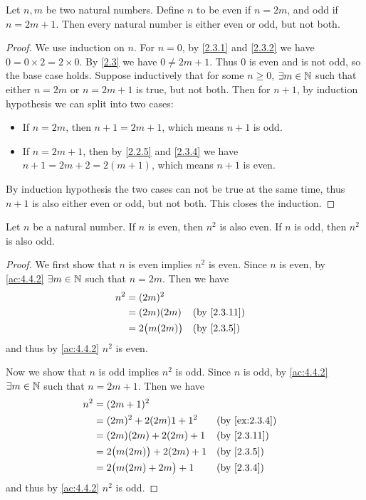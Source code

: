 \begin{ac}\label{ac:4.4.2}
  Let \(n, m\) be two natural numbers.
  Define \(n\) to be even if \(n = 2m\), and odd if \(n = 2m + 1\).
  Then every natural number is either even or odd, but not both.
\end{ac}

\begin{proof}
  We use induction on \(n\).
  For \(n = 0\), by \cref{2.3.1} and \cref{2.3.2} we have \(0 = 0 \times 2 = 2 \times 0\).
  By \cref{2.3} we have \(0 \neq 2m + 1\).
  Thus \(0\) is even and is not odd, so the base case holds.
  Suppose inductively that for some \(n \geq 0\), \(\exists m \in \mathbb{N}\) such that either \(n = 2m\) or \(n = 2m + 1\) is true, but not both.
  Then for \(n + 1\), by induction hypothesis we can split into two cases:
  \begin{itemize}
    \item If \(n = 2m\), then \(n + 1 = 2m + 1\), which means \(n + 1\) is odd.
    \item If \(n = 2m + 1\), then by \cref{2.2.5} and \cref{2.3.4} we have \(n + 1 = 2m + 2 = 2(m + 1)\), which means \(n + 1\) is even.
  \end{itemize}
  By induction hypothesis the two cases can not be true at the same time, thus \(n + 1\) is also either even or odd, but not both.
  This closes the induction.
\end{proof}

\begin{ac}\label{ac:4.4.3}
  Let \(n\) be a natural number.
  If \(n\) is even, then \(n^2\) is also even.
  If \(n\) is odd, then \(n^2\) is also odd.
\end{ac}

\begin{proof}
  We first show that \(n\) is even implies \(n^2\) is even.
  Since \(n\) is even, by \cref{ac:4.4.2} \(\exists m \in \mathbb{N}\) such that \(n = 2m\).
  Then we have
  \begin{align*}
    n^2 & = (2m)^2                            \\
        & = (2m)(2m)         &  & \by{2.3.11} \\
        & = 2\big(m(2m)\big) &  & \by{2.3.5}
  \end{align*}
  and thus by \cref{ac:4.4.2} \(n^2\) is even.

  Now we show that \(n\) is odd implies \(n^2\) is odd.
  Since \(n\) is odd, by \cref{ac:4.4.2} \(\exists m \in \mathbb{N}\) such that \(n = 2m + 1\).
  Then we have
  \begin{align*}
    n^2 & = (2m + 1)^2                                      \\
        & = (2m)^2 + 2(2m)1 + 1^2        &  & \by{ex:2.3.4} \\
        & = (2m)(2m) + 2(2m) + 1         &  & \by{2.3.11}   \\
        & = 2\big(m(2m)\big) + 2(2m) + 1 &  & \by{2.3.5}    \\
        & = 2\big(m(2m) + 2m\big) + 1    &  & \by{2.3.4}
  \end{align*}
  and thus by \cref{ac:4.4.2} \(n^2\) is odd.
\end{proof}

